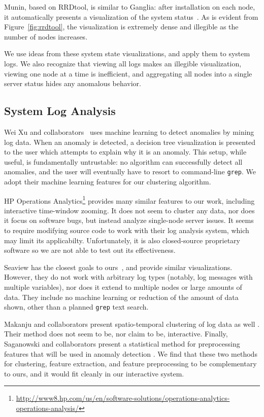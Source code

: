 \documentclass[conference]{style/acmsiggraph}
\begin{document}
Munin, based on RRDtool, is similar to Ganglia: after installation on each node, it automatically presents a visualization of the system status~\cite{Oetiker99}.
As is evident from Figure~\ref{fig:rrdtool}, the visualization is extremely dense and illegible as the number of nodes increases.

We use ideas from these system state visualizations, and apply them to system logs.
We also recognize that viewing all logs makes an illegible visualization, viewing one node at a time is inefficient, and aggregating all nodes into a single server status hides any anomalous behavior.

\subsection{System Log Analysis}

Wei Xu and collaborators~\cite{Xu09} uses machine learning to detect anomalies by mining log data.
When an anomaly is detected, a decision tree visualization is presented to the user which attempts to explain why it is an anomaly.
This setup, while useful, is fundamentally untrustable: no algorithm can successfully detect all anomalies, and the user will eventually have to resort to command-line \texttt{grep}.
We adopt their machine learning features for our clustering algorithm.

HP Operations Analytics\footnote{\url{http://www8.hp.com/us/en/software-solutions/operations-analytics-operations-analysis/}} provides many similar features to our work, including interactive time-window zooming.
It does not seem to cluster any data, nor does it focus on software bugs, but instead analyze single-node server issues.
It seems to require modifying source code to work with their log analysis system, which may limit its applicabilty.
Unfortunately, it is also closed-source proprietary software so we are not able to test out its effectiveness.

Seaview has the closest goals to ours~\cite{hangalseaview}, and provide similar visualizations.
However, they do not work with arbitrary log types (notably, log messages with multiple variables), nor does it extend to multiple nodes or large amounts of data.
They include no machine learning or reduction of the amount of data shown, other than a planned \texttt{grep} text search.

Makanju and collaborators present spatio-temporal clustering of log data as well \cite{makanju2012spatio}.
Their method does not seem to be, nor claim to be, interactive.
Finally, Saganowski and collaborators present a statistical method for preprocessing features that will be used in anomaly detection \cite{preprocessor}.
We find that these two methods for clustering, feature extraction, and feature preprocessing to be complementary to ours, and it would fit cleanly in our interactive system.
\end{document}
